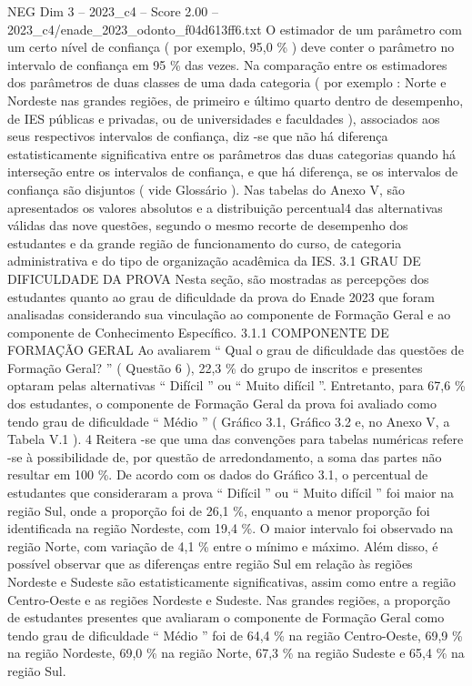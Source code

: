 \begin{textsample}{NEG Dim 3 – 2023\_c4 – Score 2.00 – 2023\_c4/enade\_2023\_odonto\_f04d613ff6.txt}
O estimador de um parâmetro com um certo nível de confiança ( por exemplo, 95,0 \% ) deve conter o parâmetro no intervalo de confiança em 95 \% das vezes.
Na comparação entre os estimadores dos parâmetros de duas classes de uma dada categoria ( por exemplo : Norte e Nordeste nas grandes regiões, de primeiro e último quarto dentro de desempenho, de IES públicas e privadas, ou de universidades e faculdades ), associados aos seus respectivos intervalos de confiança, diz -se que não há diferença estatisticamente significativa entre os parâmetros das duas categorias quando há interseção entre os intervalos de confiança, e que há diferença, se os intervalos de confiança são disjuntos ( vide Glossário ).
Nas tabelas do Anexo V, são apresentados os valores absolutos e a distribuição percentual4 das alternativas válidas das nove questões, segundo o mesmo recorte de desempenho dos estudantes e da grande região de funcionamento do curso, de categoria administrativa e do tipo de organização acadêmica da IES. 3.1 GRAU DE DIFICULDADE DA PROVA Nesta seção, são mostradas as percepções dos estudantes quanto ao grau de dificuldade da prova do Enade 2023 que foram analisadas considerando sua vinculação ao componente de Formação Geral e ao componente de Conhecimento Específico. 3.1.1 COMPONENTE DE FORMAÇÃO GERAL Ao avaliarem “ Qual o grau de dificuldade das questões de Formação Geral? ” ( Questão 6 ), 22,3 \% do grupo de inscritos e presentes optaram pelas alternativas “ Difícil ” ou “ Muito difícil ”.
Entretanto, para 67,6 \% dos estudantes, o componente de Formação Geral da prova foi avaliado como tendo grau de dificuldade “ Médio ” ( Gráfico 3.1, Gráfico 3.2 e, no Anexo V, a Tabela V.1 ). 4 Reitera -se que uma das convenções para tabelas numéricas refere -se à possibilidade de, por questão de arredondamento, a soma das partes não resultar em 100 \%.
De acordo com os dados do Gráfico 3.1, o percentual de estudantes que consideraram a prova “ Difícil ” ou “ Muito difícil ” foi maior na região Sul, onde a proporção foi de 26,1 \%, enquanto a menor proporção foi identificada na região Nordeste, com 19,4 \%.
O maior intervalo foi observado na região Norte, com variação de 4,1 \% entre o mínimo e máximo.
Além disso, é possível observar que as diferenças entre região Sul em relação às regiões Nordeste e Sudeste são estatisticamente significativas, assim como entre a região Centro-Oeste e as regiões Nordeste e Sudeste.
Nas grandes regiões, a proporção de estudantes presentes que avaliaram o componente de Formação Geral como tendo grau de dificuldade “ Médio ” foi de 64,4 \% na região Centro-Oeste, 69,9 \% na região Nordeste, 69,0 \% na região Norte, 67,3 \% na região Sudeste e 65,4 \% na região Sul.

\end{textsample}
